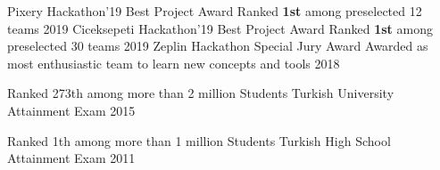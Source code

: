 


\begin{cvhonors}
  \cvhonor
    {Pixery Hackathon'19 Best Project Award} %
    {Ranked \textbf{1st} among preselected 12 teams} %
    {} %
    {2019} %
  \cvhonor
    {Ciceksepeti Hackathon'19 Best Project Award} %
    {Ranked \textbf{1st} among preselected 30 teams} %
    {} %
    {2019} %
  \cvhonor
    {Zeplin Hackathon Special Jury Award} %
    {Awarded as most enthusiastic team to learn new concepts and tools} %
    {} %
    {2018} %



  \cvhonor
    {Ranked 273th among more than 2 million Students} %
    {Turkish University Attainment Exam} %
    {} %
    {2015} %
    
  \cvhonor
    {Ranked 1th among more than 1 million Students} %
    {Turkish High School Attainment Exam} %
    {} %
    {2011} %
    \vspace{-5mm}

\end{cvhonors}

